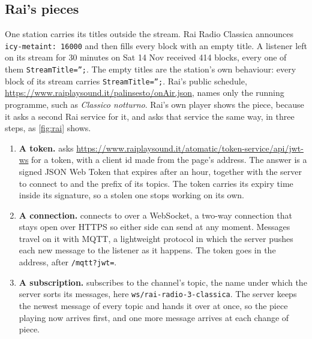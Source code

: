 \documentclass[11pt,a4paper]{article}
\begin{document}
\subsection*{Rai's pieces}

One station carries its titles outside the stream. Rai Radio Classica announces \texttt{icy-metaint: 16000} and then fills every block with an empty title. A listener left on its stream for 30 minutes on Sat 14 Nov received 414 blocks, every one of them \texttt{StreamTitle='';}.
 The empty titles are the station's own behaviour: every block of its stream carries \texttt{StreamTitle='';}. Rai's public schedule, \url{https://www.raiplaysound.it/palinsesto/onAir.json}, names only the running programme, such as \textit{Classico notturno}. Rai's own player shows the piece, because it asks a second Rai service for it, and  asks that service the same way, in three steps, as \cref{fig:rai} shows.

\begin{enumerate}[nosep]
  \item \textbf{A token.}  asks \url{https://www.raiplaysound.it/atomatic/token-service/api/jwt-ws} for a token, with a client id made from the page's address. The answer is a signed JSON Web Token that expires after an hour, together with the server to connect to and the prefix of its topics.  The token carries its expiry time inside its signature, so a stolen one stops working on its own.
  \item \textbf{A connection.}   connects to  over a WebSocket, a two-way connection that stays open over HTTPS so either side can send at any moment. Messages travel on it with MQTT, a lightweight protocol in which the server pushes each new message to the listener as it happens. The token goes in the address, after \texttt{/mqtt?jwt=}.
  \item \textbf{A subscription.}  subscribes to the channel's topic, the name under which the server sorts its messages, here \texttt{ws/rai-radio-3-classica}. The server keeps the newest message of every topic and hands it over at once, so the piece playing now arrives first, and one more message arrives at each change of piece.
\end{enumerate}
\end{document}
